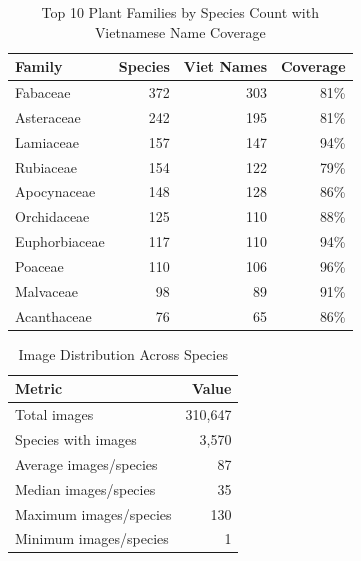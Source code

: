 

\begin{table}[t]
\centering
\caption{Top 10 Plant Families by Species Count with Vietnamese Name Coverage}
\label{tab:top_families}
\begin{tabular}{lrrr}
\toprule
\textbf{Family} & \textbf{Species} & \textbf{Viet Names} & \textbf{Coverage} \\
\midrule
Fabaceae & 372 & 303 & 81\% \\
Asteraceae & 242 & 195 & 81\% \\
Lamiaceae & 157 & 147 & 94\% \\
Rubiaceae & 154 & 122 & 79\% \\
Apocynaceae & 148 & 128 & 86\% \\
Orchidaceae & 125 & 110 & 88\% \\
Euphorbiaceae & 117 & 110 & 94\% \\
Poaceae & 110 & 106 & 96\% \\
Malvaceae & 98 & 89 & 91\% \\
Acanthaceae & 76 & 65 & 86\% \\
\bottomrule
\end{tabular}
\end{table}


\begin{table}[t]
\centering
\caption{Image Distribution Across Species}
\label{tab:image_distribution}
\begin{tabular}{lr}
\toprule
\textbf{Metric} & \textbf{Value} \\
\midrule
Total images & 310,647 \\
Species with images & 3,570 \\
Average images/species & 87 \\
Median images/species & 35 \\
Maximum images/species & 130 \\
Minimum images/species & 1 \\
\bottomrule
\end{tabular}
\end{table}

